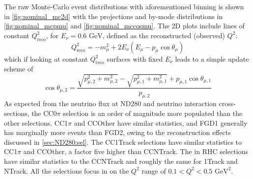 \iffalse
The raw Monte-Carlo \pmu \cosmu event distributions with aforementioned binning is shown in \autoref{fig:nominal_mc2d} with the projections and by-mode distributions in \autoref{fig:nominal_mcpmu} and \autoref{fig:nominal_mccosmu}. The 2D plots include lines of constant $Q^2_{\text{reco}}$, for $E_\nu = 0.6 \text{ GeV}$, defined as the reconstructed (observed) $Q^2$:
\begin{equation}
Q^2_{\text{reco}} = -m^2_\mu + 2E_\nu \left( E_\mu-p_\mu\cos\theta_\mu \right)
\end{equation}
which if looking at constant $Q^2_{\text{reco}}$ surfaces with fixed $E_\nu$ leads to a simple update scheme of
\begin{equation}
\cos\theta_{\mu, 2} = \frac{\sqrt{p_{\mu,2}^2+m_{\mu,2}^2} - \sqrt{p_{\mu,1}^2+m_{\mu,1}^2}+p_{\mu,1}\cos\theta_{\mu,1}}{p_{\mu,2}}
\end{equation}
As expected from the neutrino flux at ND280 and neutrino interaction cross-sections, the CC0$\pi$ selection is an order of magnitude more populated than the other \numu selections. CC1$\pi$ and CCOther have similar statistics, and FGD1 generally has marginally more events than FGD2, owing to the reconstruction effects discussed in \autoref{sec:ND280:sel}. The \numubar CC1Track selections have similar statistics to \numu CC1$\pi$ and CCOther, a factor five higher than \numubar CCNTrack. The \numu in RHC selections have similar statistics to the \numubar CCNTrack and roughly the same for 1Track and NTrack. All the selections focus in on the $Q^2$ range of $0.1 < Q^2 < 0.5 \text{ GeV}^2$.
